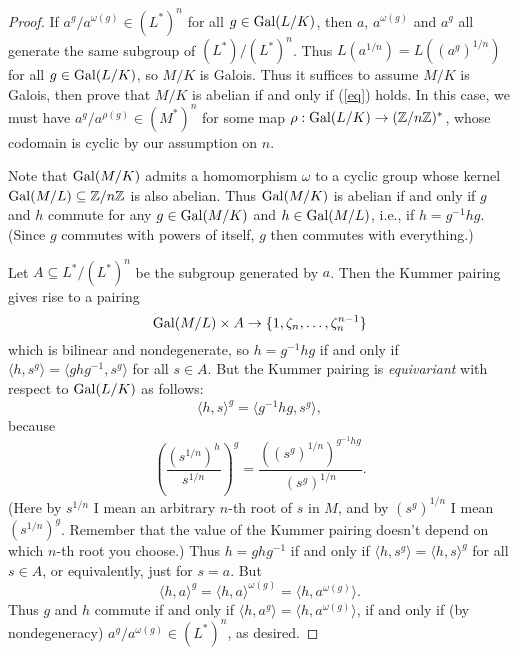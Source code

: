 \begin{proof}
If $a^g/a^{\omega(g)} \in (L^*)^n$ for all $g \in \operatorname{Gal}(L/K)$,
then $a$, $a^{\omega(g)}$ and $a^g$ all generate the same subgroup
of $(L^*)/(L^*)^n$. Thus $L(a^{1/n}) = L((a^g)^{1/n})$ for all $g \in
\operatorname{Gal}(L/K)$, so $M/K$ is Galois. Thus it suffices to assume $M/K$ is
Galois, then prove that $M/K$ is abelian if and only if (\ref{eq}) holds.
In this case, we must have $a^g/a^{\rho(g)} \in (M^*)^n$ for some map
$\rho: \operatorname{Gal}(L/K) \to (\mathbb{Z}/n\mathbb{Z})^*$, whose codomain is cyclic by our
assumption on $n$.

Note that $\operatorname{Gal}(M/K)$ admits a homomorphism $\omega$ to a cyclic group whose
kernel $\operatorname{Gal}(M/L) \subseteq \mathbb{Z}/n\mathbb{Z}$ is also abelian. Thus $\operatorname{Gal}(M/K)$
is abelian if and only if $g$ and $h$ commute for any $g \in \operatorname{Gal}(M/K)$
and $h \in \operatorname{Gal}(M/L)$, i.e., if $h = g^{-1}hg$.
(Since $g$ commutes with powers of itself, $g$ then
commutes with everything.)

Let $A \subseteq L^*/(L^*)^n$ be the subgroup generated by $a$. Then
the Kummer pairing gives rise to a pairing
\[
\operatorname{Gal}(M/L) \times A \to \{1, \zeta_{n}, \dots, \zeta_n^{n-1}\}
\]
which is bilinear and nondegenerate, so $h = g^{-1}hg$ if and only if
$\langle h, s^g \rangle = \langle ghg^{-1}, s^g \rangle$ for all
$s \in A$. But the Kummer pairing is \emph{equivariant} with respect
to $\operatorname{Gal}(L/K)$ as follows:
\[
\langle h,s \rangle^g = \langle g^{-1}hg, s^g \rangle,
\]
because
\[
\left( \frac{(s^{1/n})^h}{s^{1/n}} \right)^g
= \frac{((s^g)^{1/n})^{g^{-1}hg}}{(s^g)^{1/n}}.
\]
(Here by $s^{1/n}$ I mean an arbitrary $n$-th root of $s$ in $M$,
and by $(s^g)^{1/n}$ I mean $(s^{1/n})^g$. Remember that the value of the
Kummer pairing doesn't depend on which $n$-th root you choose.)
Thus $h = ghg^{-1}$ if and only if $\langle h,s^g \rangle =
\langle h,s \rangle^g$ for all $s \in A$, or equivalently,
just for $s=a$.
But
\[
\langle h,a \rangle^g = \langle h,a \rangle^{\omega(g)}
= \langle h, a^{\omega(g)} \rangle.
\]
Thus $g$ and $h$ commute if and only if $\langle h, a^g \rangle
= \langle h, a^{\omega(g)}\rangle$, if and only if (by nondegeneracy)
$a^g/a^{\omega(g)} \in (L^*)^n$, as desired.
\end{proof}


